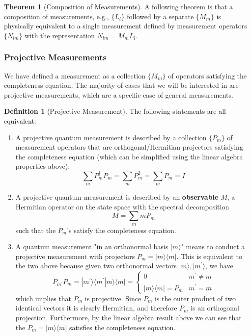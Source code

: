 \documentclass{article}
\theoremstyle{definition}
\newtheorem{theorem}{Theorem}[section]
\newtheorem{definition}{Definition}[section]
\begin{document}
    \begin{theorem}[Composition of Measurements]
    A following theorem is that a composition of measurements, e.g., $\{L_l\}$ followed by a separate $\{M_m\}$ is physically equivalent to a single measurement defined by measurement operators $\{N_{lm}\}$ with the representation $N_{lm} = M_m L_l$.  
    \end{theorem}

    \subsubsection{Projective Measurements}

      We have defined a measurement as a collection $\{ M_m\}$ of operators satisfying the completeness equation. The majority of cases that we will be interested in are projective measurements, which are a specific case of general measurements. 

      \begin{definition}[Projective Measurement]
        The following statements are all equivalent:

        \begin{enumerate}
          \item A projective quantum measurement is described by a collection $\{P_m\}$ of measurement operators that are orthogonal/Hermitian projectors satisfying the completeness equation (which can be simplified using the linear algebra properties above):
            \[\sum_m P_m^\dagger P_m = \sum_m P_m^2 = \sum_m P_m = I\]
          \item A projective quantum measurement is described by an \textbf{observable} $M$, a Hermitian operator on the state space with the spectral decomposition
            \[M = \sum_m m P_m\]
          such that the $P_m$'s satisfy the completeness equation.
          \item A quantum measurement "in an orthonormal basis $|m\rangle$" means to conduct a projective measurement with projectors $P_m = |m \rangle \langle m |$. This is equivalent to the two above because given two orthonormal vectors $|m\rangle, |m^\prime \rangle$, we have
            \[P_{m^\prime} P_m = |m^\prime \rangle \langle m^\prime | m \rangle \langle m | = \begin{cases} 0 & m^\prime \neq m \\ |m \rangle \langle m | = P_m & m^\prime = m \end{cases}\]
          which implies that $P_m$ is projective. Since $P_m$ is the outer product of two identical vectors it is clearly Hermitian, and therefore $P_m$ is an orthogonal projection. Furthermore, by the linear algebra result above we can see that the $P_m = |m\rangle \langle m|$ satisfies the completeness equation.
        \end{enumerate}
      \end{definition}
\end{document}

